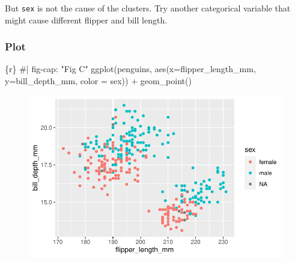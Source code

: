 \documentclass[
  letterpaper,
  DIV=11,
  numbers=noendperiod]{scrreprt}
\newenvironment{Shaded}{\begin{snugshade}}{\end{snugshade}}
\newcommand{\AttributeTok}[1]{\textcolor[rgb]{0.40,0.45,0.13}{#1}}
\newcommand{\CommentTok}[1]{\textcolor[rgb]{0.37,0.37,0.37}{#1}}
\newcommand{\FunctionTok}[1]{\textcolor[rgb]{0.28,0.35,0.67}{#1}}
\newcommand{\InformationTok}[1]{\textcolor[rgb]{0.37,0.37,0.37}{#1}}
\newcommand{\NormalTok}[1]{\textcolor[rgb]{0.00,0.23,0.31}{#1}}
\newcommand{\SpecialCharTok}[1]{\textcolor[rgb]{0.37,0.37,0.37}{#1}}
\begin{document}
\begin{tcolorbox}[enhanced jigsaw, colframe=quarto-callout-important-color-frame, breakable, colback=white, toprule=.15mm, leftrule=.75mm, left=2mm, opacityback=0, rightrule=.15mm, arc=.35mm, bottomrule=.15mm]
But \texttt{sex} is not the cause of the clusters. Try another
categorical variable that might cause different flipper and bill length.
\end{tcolorbox}

\begin{tcolorbox}[enhanced jigsaw, colframe=quarto-callout-note-color-frame, breakable, colback=white, toprule=.15mm, leftrule=.75mm, left=2mm, opacityback=0, rightrule=.15mm, arc=.35mm, bottomrule=.15mm]

\hypertarget{plot-1}{%
\subsubsection*{Plot}\label{plot-1}}

\begin{Shaded}
\begin{Highlighting}[]
\InformationTok{\textasciigrave{}\textasciigrave{}\textasciigrave{}\{r\}}
\CommentTok{\#| fig{-}cap: "Fig C"}
\FunctionTok{ggplot}\NormalTok{(penguins, }\FunctionTok{aes}\NormalTok{(}\AttributeTok{x=}\NormalTok{flipper\_length\_mm, }\AttributeTok{y=}\NormalTok{bill\_depth\_mm, }\AttributeTok{color =}\NormalTok{ sex)) }\SpecialCharTok{+}
  \FunctionTok{geom\_point}\NormalTok{()}
\InformationTok{\textasciigrave{}\textasciigrave{}\textasciigrave{}}
\end{Highlighting}
\end{Shaded}

\begin{figure}[H]

{\centering \includegraphics{03-content_files/figure-pdf/unnamed-chunk-8-1.pdf}

}
\end{figure}
\end{tcolorbox}
\end{document}
